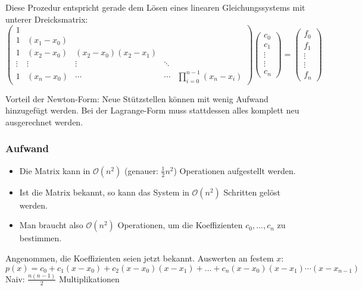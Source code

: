Diese Prozedur entspricht gerade dem Lösen eines linearen Gleichungssystems mit unterer Dreicksmatrix:
\begin{equation*}
 \begin{pmatrix}
    1 & & & & \\
    1 & (x_1-x_0) & & & \\
    1 & (x_2-x_0) & (x_2-x_0)(x_2-x_1) & & \\
    \vdots & \vdots & \vdots & \ddots & \\
    1 & (x_n-x_0) & \cdots & \cdots & \prod_{i=0}^{n-1}(x_n-x_i)
 \end{pmatrix} \begin{pmatrix}
    c_0 \\ c_1 \\ \vdots \\ \vdots \\ c_n
 \end{pmatrix} =
 \begin{pmatrix}
    f_0 \\ f_1 \\ \vdots \\ \vdots \\ f_n
 \end{pmatrix}
\end{equation*}

Vorteil der Newton-Form: Neue Stützstellen können mit wenig Aufwand hinzugefügt werden.
Bei der Lagrange-Form muss stattdessen alles komplett neu ausgerechnet werden.

\subsubsection{Aufwand}

\begin{itemize}
 \item Die Matrix kann in $\mathcal{O}(n^2)$ (genauer: $\frac{1}{2} n^2$) Operationen aufgestellt werden.
 \item Ist die Matrix bekannt, so kann das System in $\mathcal{O}(n^2)$ Schritten gelöst werden.
 \item Man braucht also $\mathcal{O}(n^2)$ Operationen, um die Koeffizienten $c_0,\hdots,c_n$ zu bestimmen.
\end{itemize}
Angenommen, die Koeffizienten seien jetzt bekannt. Auswerten an festem $x$:
 \begin{equation*}
  p(x) = c_0 + c_1(x-x_0) + c_2(x-x_0)(x-x_1) + \hdots + c_n(x-x_0)(x-x_1)\cdots (x-x_{n-1})
 \end{equation*}
 Naiv: $\frac{n(n - 1)}{2}$ Multiplikationen

